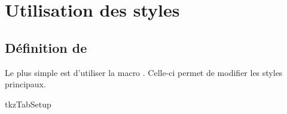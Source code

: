 
%
\section{Utilisation des styles}
\subsection{Définition de } 

Le plus simple est d'utiliser la macro  . Celle-ci permet de modifier les styles principaux.

\begin{NewMacroBox}{tkzTabSetup}{}


\end{NewMacroBox}
